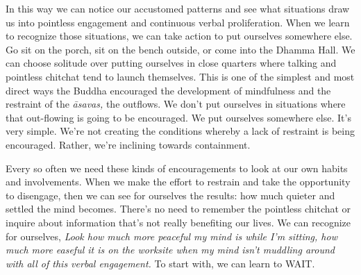 In this way we can notice our accustomed patterns and see what 
situations draw us into pointless engagement and continuous verbal 
proliferation. When we learn to recognize those situations, we can take 
action to put ourselves somewhere else. Go sit on the porch, sit on the 
bench outside, or come into the Dhamma Hall. We can choose solitude 
over putting ourselves in close quarters where talking and pointless 
chitchat tend to launch themselves. This is one of the simplest and 
most direct ways the Buddha encouraged the development of mindfulness 
and the restraint of the \emph{āsavas,} the outflows. We don't put 
ourselves in situations where that out-flowing is going to be 
encouraged. We put ourselves somewhere else. It's very simple. We're 
not creating the conditions whereby a lack of restraint is being 
encouraged. Rather, we're inclining towards containment.

Every so often we need these kinds of encouragements to look at our own 
habits and involvements. When we make the effort to restrain and take 
the opportunity to disengage, then we can see for ourselves the 
results: how much quieter and settled the mind becomes. There's no need 
to remember the pointless chitchat or inquire about information that's 
not really benefiting our lives. We can recognize for ourselves, 
\emph{Look how much more peaceful my mind is while I'm sitting, how 
much more easeful it is on the worksite when my mind isn't muddling 
around with all of this verbal engagement.} To start with, we can learn 
to WAIT.

